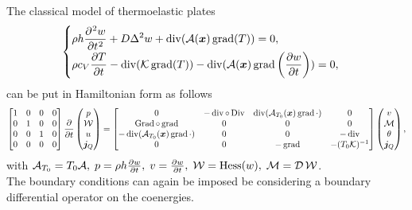 \documentclass[11t]{article}
\DeclareMathOperator*{\grad}{grad}
\DeclareMathOperator*{\Grad}{Grad}
\DeclareMathOperator*{\Div}{Div}
\renewcommand{\div}{\operatorname{div}}
\DeclareMathOperator*{\Hess}{Hess}
\begin{document}
The classical model of thermoelastic plates \cite{ThLasiecka}
\begin{equation}
\begin{cases}
\displaystyle \rho h \diffp[2]{w}{t} + D \Delta^2 w + \div(\mathcal{A}(\bm{x}) \grad(T)) = 0, \vspace{2pt} \\
\displaystyle \rho c_V \diffp{T}{t} - \div(\mathcal{K} \grad(T)) - \div(\mathcal{A}(\bm{x}) \grad\left(\diffp{w}{t}\right)) = 0,
\end{cases}
\end{equation}
can be put in Hamiltonian form as follows
\begin{equation}
\begin{bmatrix}
1 & 0 & 0 & 0\\
0 & 1 & 0 & 0\\
0 & 0 & 1 & 0\\
0 & 0 & 0 & 0\\
\end{bmatrix}
\diffp{}{t}
\begin{pmatrix}
p \\
\mathcal{W} \\
u \\
\bm{j}_Q \\
\end{pmatrix} = 
\begin{bmatrix}
0 & -\div \circ \Div & \div(\mathcal{A}_{T_0}(\bm{x}) \grad \cdot) & 0\\
\Grad \circ \grad & 0 & 0 & 0 \\
- \div(\mathcal{A}_{T_0}(\bm{x}) \grad \cdot) & 0 & 0 & -\div \\
0 & 0 & -\grad & - (T_0 \mathcal{K})^{-1} \\
\end{bmatrix}
\begin{pmatrix}
v \\
\mathcal{M} \\
\theta \\
\bm{j}_Q \\
\end{pmatrix},
\end{equation}
with $\mathcal{A}_{T_0} = T_0 \mathcal{A}, \; p = \rho h \diffp{w}{t}, \; v = \diffp{w}{t}, \; \mathcal{W} = \Hess(w), \; \mathcal{M} = \mathcal{D \, W}$. \\
The boundary conditions can again be imposed be considering a boundary differential operator on the coenergies.
\end{document}

